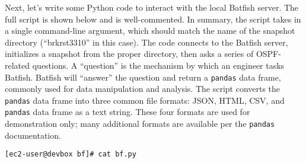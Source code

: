 Next, let's write some Python code to interact with the local Batfish server.
The full script is shown below and is well-commented. In summary, the script
takes in a single command-line argument, which should match the name of the
snapshot directory (``brkrst3310'' in this case). The code connects to the
Batfish server, initializes a snapshot from the proper directory, then asks
a series of OSPF-related questions. A ``question'' is the mechanism by which
an engineer tasks Batfish. Batfish will ``answer'' the question and return a
\verb|pandas| data frame, commonly used for data manipulation and analysis.
The script converts the \verb|pandas| data frame into three common file
formats: JSON, HTML, CSV, and \verb|pandas| data frame as a text string.
These four formats are used for demonstration only; many additional formats
are available per the \verb|pandas| documentation.

\begin{verbatim}
[ec2-user@devbox bf]# cat bf.py
\end{verbatim}


